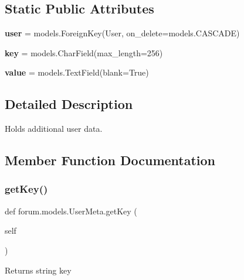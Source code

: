 \subsection*{Static Public Attributes}
\begin{DoxyCompactItemize}
\item 
\mbox{\label{classforum_1_1models_1_1_user_meta_a07b7bea47d3ede5a8c8f3c3ae00fc14b}} 
{\bfseries user} = models.\+Foreign\+Key(User, on\+\_\+delete=models.\+C\+A\+S\+C\+A\+DE)
\item 
\mbox{\label{classforum_1_1models_1_1_user_meta_a5f052f2a6a6bd5fae22c86d45a945f0c}} 
{\bfseries key} = models.\+Char\+Field(max\+\_\+length=256)
\item 
\mbox{\label{classforum_1_1models_1_1_user_meta_a7ea2e429fe2dcfb0a5559f14f6991929}} 
{\bfseries value} = models.\+Text\+Field(blank=True)
\end{DoxyCompactItemize}


\subsection{Detailed Description}
Holds additional user data. 

\subsection{Member Function Documentation}
\mbox{\label{classforum_1_1models_1_1_user_meta_af5ee69e5ad0d80a8b4bb1df7dd44c212}} 
\subsubsection{\texorpdfstring{get\+Key()}{getKey()}}
{\footnotesize\ttfamily def forum.\+models.\+User\+Meta.\+get\+Key (\begin{DoxyParamCaption}\item[{}]{self }\end{DoxyParamCaption})}

\begin{DoxyReturn}{Returns}
string key 
\end{DoxyReturn}
\mbox{\label{classforum_1_1models_1_1_user_meta_ac395c1b7f03bf5060dcb3681c0b7e698}} 
